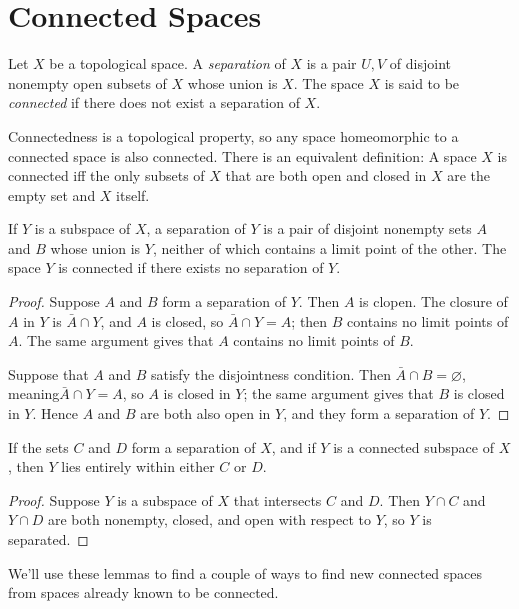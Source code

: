 \documentclass[10pt]{report}
\begin{document}
\section{Connected Spaces}
\begin{definition}
  Let $X$ be a topological space.
  A \emph{separation} of $X$ is a pair $U,V$ of disjoint nonempty open subsets of $X$ whose union is $X$.
  The space $X$ is said to be \emph{connected} if there does not exist a separation of $X$.
\end{definition}

Connectedness is a topological property, so any space homeomorphic to a connected space is also connected.
There is an equivalent definition:
A space $X$ is connected iff the only subsets of $X$ that are both open and closed in $X$ are the empty set and $X$ itself.

\begin{lemma}
  If $Y$ is a subspace of $X$, a separation of $Y$ is a pair of disjoint nonempty sets $A$ and $B$ whose union is $Y$, neither of which contains a limit point of the other.
  The space $Y$ is connected if there exists no separation of $Y$.
\end{lemma}
\begin{proof}
  Suppose $A$ and $B$ form a separation of $Y$.
  Then $A$ is clopen.
  The closure of $A$ in $Y$ is $\bar A \cap Y$, and $A$ is closed, so $\bar A \cap Y = A$; then $B$ contains no limit points of $A$.
  The same argument gives that $A$ contains no limit points of $B$.

  Suppose that $A$ and $B$ satisfy the disjointness condition.
  Then $\bar A \cap B = \varnothing$, meaning$\bar{A} \cap Y = A$, so $A$ is closed in $Y$; the same argument gives that $B$ is closed in $Y$.
  Hence $A$ and $B$ are both also open in $Y$, and they form a separation of $Y$.
\end{proof}

\begin{lemma}
  If the sets $C$ and $D$ form a separation of $X$, and if $Y$ is a connected subspace of $X$, then $Y$ lies entirely within either $C$ or $D$.
\end{lemma}
\begin{proof}
  Suppose $Y$ is a subspace of $X$ that intersects $C$ and $D$.
  Then $Y \cap C$ and $Y \cap D$ are both nonempty, closed, and open with respect to $Y$, so $Y$ is separated.
\end{proof}

We'll use these lemmas to find a couple of ways to find new connected spaces from spaces already known to be connected.
\end{document}
